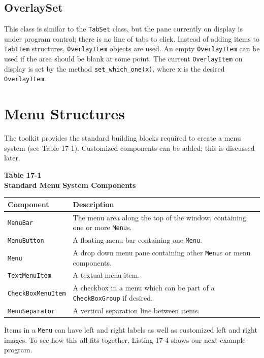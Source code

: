 \subsection{OverlaySet}

This class is similar to the \texttt{TabSet} class,
but the pane currently on display is under program control; there is no line of
tabs to click.  Instead of adding items to \texttt{TabItem} structures,
\texttt{OverlayItem} objects are used. An empty \texttt{OverlayItem} can be used
if the area should be blank at some point. The current \texttt{OverlayItem} on
display is set by the method \texttt{set\_which\_one(x)}, where \texttt{x} is
the desired \texttt{OverlayItem}.

\section{Menu Structures}

The toolkit provides the standard building blocks required to create
a menu system (see Table 17-1). Customized components can
be added; this is discussed later.

\bigskip

\begin{center}
{\centering\sffamily\bfseries
Table 17-1 \\
Standard Menu System Components}
\end{center}
\begin{flushleft}
\begin{supertabular}{|m{1.6in}|m{4.3in}|}
\hline
\sffamily\bfseries Component &
\sffamily\bfseries Description\\\hline
\texttt{MenuBar} &
The menu area along the top of the window, containing one or
more \texttt{Menu}s.\\\hline
\texttt{MenuButton} &
A floating menu bar containing one \texttt{Menu}.\\\hline
\texttt{Menu} &
A drop down menu pane containing other \texttt{Menu}s or menu
components.\\\hline
\texttt{TextMenuItem} &
A textual menu item.\\\hline
\ttfamily \texttt{CheckBoxMenuItem}  &
A checkbox in a menu which can be part of a \texttt{CheckBoxGroup} if
desired.\\\hline
\texttt{MenuSeparator} &
A vertical separation line between items.\\\hline
\end{supertabular}
\end{flushleft}
Items in a \texttt{Menu} can have left and right labels as well as
customized left and right images. To see how this all fits together,
Listing 17-4 shows our next example program.

